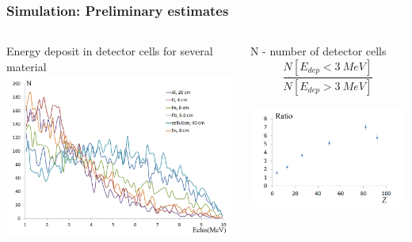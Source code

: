 \documentclass[11pt]{beamer}
\begin{document}
\begin{frame}
    \frametitle{Simulation: Preliminary estimates}
    \begin{columns}
        \begin{column}{0.5\textwidth}
            Energy deposit in detector cells for several material\\
            \includegraphics[width=1\textwidth]{figures/sim_1.jpeg}
            
        \end{column}
        \begin{column}{0.5\textwidth}
            N - number of detector cells
            $$
           \frac{N[E_{dep} < 3~MeV]}
            {N[E_{dep} > 3~MeV]}
            $$
       
            \includegraphics[width=1\textwidth]{figures/sim_2.jpeg}
        \end{column}
    \end{columns}  
\end{frame}
\end{document}
